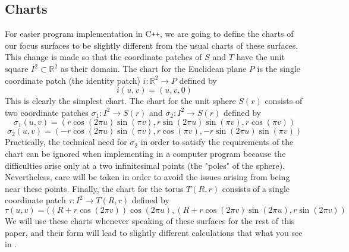 \documentclass{article}
\newcommand{\R}{\mathbb{R}}
\begin{document}
	\subsection{Charts}
		For easier program implementation in C\texttt{++}, we are going to define the charts of our focus surfaces to be slightly different from the usual charts of these surfaces.
		This change is made so that the coordinate patches of $S$ and $T$ have the unit square $I^2 \subset \R^2$ as their domain.
		The chart for the Euclidean plane $P$ is the single coordinate patch (the identity patch) $i: \R^2 \to P$ defined by
		$$ i(u,v) = ( u , v , 0 ) $$
		This is clearly the simplest chart.
		The chart for the unit sphere $S(r)$ consists of two coordinate patches $\sigma_1:I^2 \to S(r)$ and $\sigma_2:I^2 \to S(r)$ defined by
		$$ \sigma_1(u,v) = ( r\cos(2\pi u)\sin(\pi v) , r\sin(2\pi u)\sin(\pi v) , r\cos(\pi v) ) $$
		$$ \sigma_2(u,v) = ( -r\cos(2\pi u)\sin(\pi v) , r\cos(\pi v) , -r\sin(2\pi u)\sin(\pi v) ) $$
		Practically, the technical need for $\sigma_2$ in order to satisfy the requirements of the chart can be ignored when implementing in a computer program because the difficulties arise only at a two infinitesimal points (the "poles" of the sphere).
		Nevertheless, care will be taken in order to avoid the issues arising from being near these points. 
		Finally, the chart for the torus $T(R,r)$ consists of a single coordinate patch $\tau:I^2 \to T(R,r)$ defined by
		$$ \tau(u,v) = ( (R+r\cos(2\pi v))\cos(2\pi u) , (R+r\cos(2\pi v)\sin(2\pi u) , r\sin(2\pi v) ) $$
		We will use these charts whenever speaking of these surfaces for the rest of this paper, and their form will lead to slightly different calculations that what you see in \cite{BanchoffLovett_DiffGeo_2010,Irons_GeodesicsTorus_2005}.
		
\end{document}
